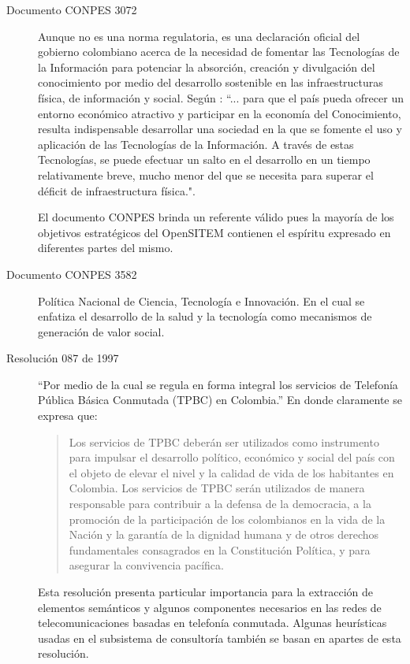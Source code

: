 \begin{description}
\item[Documento CONPES 3072] Aunque no es una norma regulatoria, es una declaración oficial del gobierno colombiano acerca de la necesidad de fomentar las Tecnologías de la Información para potenciar la absorción, creación y divulgación del conocimiento por medio del desarrollo sostenible en las infraestructuras física, de información y social. Según \cite{mincomunicaciones3072}:  “... para que el país pueda ofrecer un entorno económico atractivo y participar en la economía del Conocimiento, resulta indispensable desarrollar una sociedad en la que se fomente el uso y aplicación de las Tecnologías de la Información. A través de estas Tecnologías, se puede efectuar un salto en el desarrollo en un tiempo relativamente breve, mucho menor del que se necesita para superar el déficit de infraestructura física.".

El documento CONPES brinda un referente válido pues la mayoría de los objetivos estratégicos del OpenSITEM contienen el espíritu expresado en diferentes partes del mismo.

\item[Documento CONPES 3582] Política Nacional de Ciencia, Tecnología e Innovación. En el cual se enfatiza el desarrollo de la salud y la tecnología como mecanismos de generación de valor social.

\item[Resolución 087 de 1997] “Por medio de la cual se regula en forma integral los servicios de Telefonía Pública Básica Conmutada (TPBC) en Colombia.” En donde claramente se expresa que: \begin{quote}
Los servicios de TPBC deberán ser utilizados como instrumento para impulsar el desarrollo político, económico y social del país con el objeto de elevar el nivel y la calidad de vida de los habitantes en Colombia. Los servicios de TPBC serán utilizados de manera responsable para contribuir a la defensa de la democracia, a la promoción de la participación de los colombianos en la vida de la Nación y la garantía de la dignidad humana y de otros derechos fundamentales consagrados en la Constitución Política, y para asegurar la convivencia pacífica.\end{quote} 

Esta resolución presenta particular importancia para la extracción de elementos semánticos y algunos componentes necesarios en las redes de telecomunicaciones basadas en telefonía conmutada. Algunas heurísticas usadas en el subsistema de consultoría también se basan en apartes de esta resolución.


\end{description}
